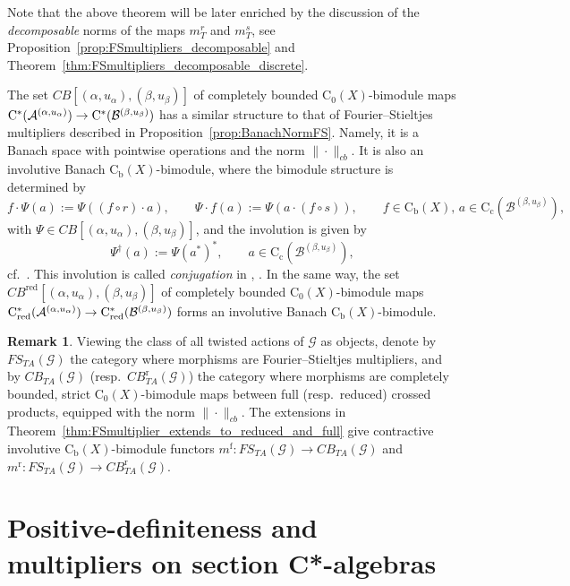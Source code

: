 \documentclass[11 pt, leqno]{amsart}
\numberwithin{equation}{section}
\theoremstyle{plain}
\theoremstyle{definition}
\newtheorem {rem} [thm]{Remark}
\newcommand*{\contc}{\mathrm{C_c}}%
\newcommand*{\contz}{\mathrm{C_0}}%
\newcommand*{\contb}{\mathrm{C_b}}%
\DeclareMathOperator{\red}{red}%
\DeclareMathOperator{\rd}{r}%
\DeclareMathOperator{\f}{f}%
\newcommand{\B}{\mathcal B}
\newcommand{\m}{m}
\newcommand{\G}{\mathcal G} %
\newcommand{\A}{\mathcal A}
\newcommand{\cst}{\ifmmode\mathrm{C}^*\else{$\mathrm{C}^*$}\fi}
\begin{document}
Note that the above theorem will be later enriched by the discussion of the \emph{decomposable} norms of the maps $m_T^r$ and $m_T^s$, see Proposition~\ref{prop:FSmultipliers_decomposable} and Theorem~\ref{thm:FSmultipliers_decomposable_discrete}.

The set $CB[(\alpha,u_{\alpha}),(\beta,u_{\beta})]$ of completely bounded $\contz(X)$-bimodule maps $\cst( \A^{(\alpha,u_{\alpha})} ) \to \cst( \B^{(\beta,u_{\beta})} )$ has a similar structure to that of Fourier--Stieltjes multipliers described in Proposition~\ref{prop:BanachNormFS}. 
Namely, it is a Banach space with pointwise operations and the norm $\|\cdot\|_{cb}$. 
It is also an involutive Banach $\contb(X)$-bimodule, where the bimodule structure is determined by
\[
    f \cdot \Psi (a) := \Psi((f\circ r)\cdot a), \qquad 
     \Psi \cdot f (a) := \Psi( a \cdot (f\circ s)), \qquad 
    f\in \contb(X), \,a\in \contc(\B^{(\beta,u_{\beta})}), 
\]
with $\Psi\in CB[(\alpha,u_{\alpha}),(\beta,u_{\beta})]$, and the involution is given by 
\[
    \Psi^{\dagger}(a) := \Psi (a^*)^*, \qquad a\in \contc(\B^{(\beta,u_{\beta})}),
\]
cf.\ \cite[Proposition 1]{Walter}. 
This involution is called \emph{conjugation} in \cite{Walter}, \cite{BedosConti}. 
In the same way, the set $CB^{\red}[(\alpha,u_{\alpha}),(\beta,u_{\beta})]$ of completely bounded $\contz(X)$-bimodule maps $\cst_{\red}(\A^{(\alpha,u_{\alpha})})\to \cst_{\red}(\B^{(\beta,u_{\beta})})$ forms an involutive Banach $\contb(X)$-bimodule.

\begin{rem}\label{rem:functors_from_FS}
Viewing the class of all twisted actions of $\G$ as objects, denote by $FS_{TA}(\G)$ the category where morphisms are Fourier--Stieltjes multipliers, and by $CB_{TA}(\G)$  (resp.\ $CB_{TA}^{\rd}(\G)$) the category where morphisms are completely bounded, strict $\contz(X)$-bimodule maps between full (resp.\ reduced) crossed products, equipped with the norm $\|\cdot\|_{cb}$. 
The extensions in Theorem~\ref{thm:FSmultiplier_extends_to_reduced_and_full} give contractive involutive $\contb(X)$-bimodule functors $\m^{\f}:FS_{TA}(\G)\to CB_{TA}(\G)$ and $\m^{\rd}:FS_{TA}(\G)\to CB_{TA}^{\rd}(\G)$.
\end{rem}



%
%
\section{Positive-definiteness and multipliers on section C*-algebras} 
\label{Sec:positive-definite}
\end{document}
